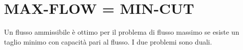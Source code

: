 \documentclass[\main/main.tex]{subfiles}
\begin{document}
\section{MAX-FLOW = MIN-CUT}

\begin{theorem}[Max-flow = Min-cut]
  Un flusso ammissibile è ottimo per il problema di flusso massimo se esiste un taglio minimo con capacità pari al flusso. I due problemi sono duali.
\end{theorem}
\end{document}
